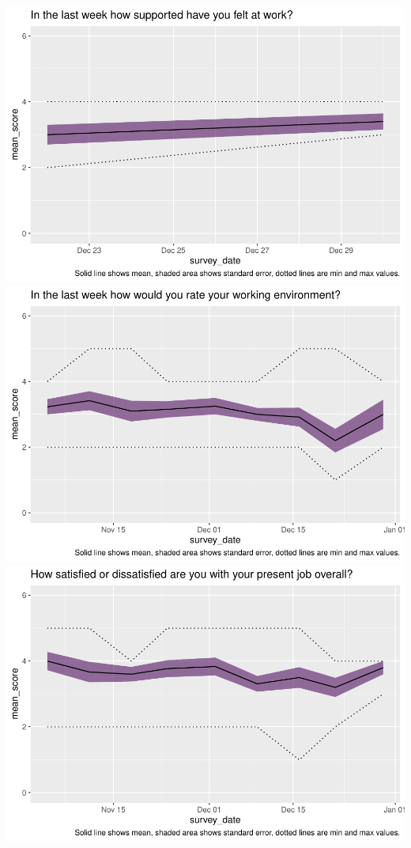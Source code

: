 \documentclass[
  10pt,
]{article}
\begin{document}
\includegraphics{../pdf/Report_files/figure-latex/likert-7.pdf}
\includegraphics{../pdf/Report_files/figure-latex/likert-8.pdf}
\includegraphics{../pdf/Report_files/figure-latex/likert-9.pdf}
\end{document}
